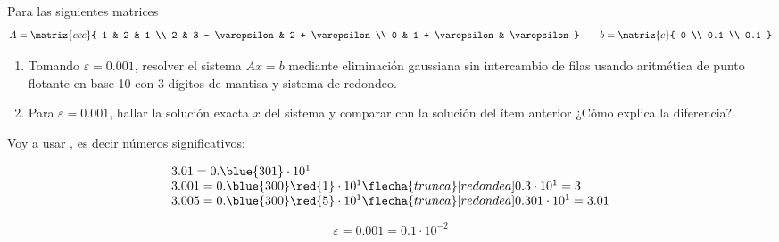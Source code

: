 \begin{enunciado}{\ejercicio}
  Para las siguientes matrices
  $$
    A =
    \matriz{ccc}{
      1 & 2 & 1 \\
      2 & 3 - \varepsilon & 2 + \varepsilon \\
      0 & 1 + \varepsilon & \varepsilon
    }
    \qquad
    b =
    \matriz{c}{
      0  \\
      0.1 \\
      0.1
    }
  $$
  \begin{enumerate}[label=(\alph*)]
    \item Tomando $\varepsilon = 0.001$, resolver el sistema $Ax = b$ mediante eliminación gaussiana sin
          intercambio de filas usando aritmética de punto flotante en base 10 con 3 dígitos de mantisa
          y sistema de redondeo.

    \item Para $\varepsilon = 0.001$, hallar la solución exacta $x$ del sistema y comparar con la solución del ítem anterior
          ¿Cómo explica la diferencia?
  \end{enumerate}
\end{enunciado}

Voy a usar , es decir  números significativos:

$$
  \begin{array}{l}
    3.01 = 0.\blue{301} \cdot 10^1                                                       \\
    3.001 = 0.\blue{300}\red{1} \cdot 10^1 \flecha{trunca}[redondea] 0.3 \cdot 10^1  = 3 \\
    3.005 = 0.\blue{300}\red{5} \cdot 10^1 \flecha{trunca}[redondea] 0.301 \cdot 10^1 = 3.01
  \end{array}
$$

$$
  \varepsilon = 0.001 = 0.1 \cdot 10^{-2}
$$

